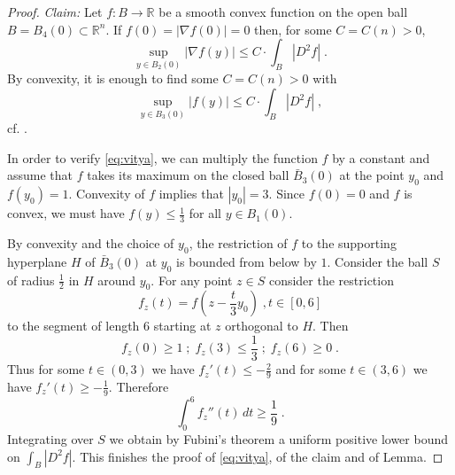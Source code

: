 \documentclass[12pt,leqno]{amsart}
\numberwithin{equation}{section}
\theoremstyle{definition}
\theoremstyle{remark}
\newcommand{\R}{\mathbb{R}}
\begin{document}
\begin{proof}
\emph{Claim:} Let $f:B \to \R$ be a smooth convex function on the open ball $B=B_4 (0)\subset \R^n$.
If $f(0)=|\nabla f(0)| =0$ then, for some $C=C(n)>0$,
$$\sup_{y\in B_2 (0)} |\nabla f (y)| \leq C\cdot \int _{B} |D^2f| \;.$$
By convexity, it is enough to find some $C=C(n)>0$ with
\begin{equation}  \label{eq:vitya}
\sup _{y\in B_3 (0) }| f(y)| \leq C \cdot \int _{B} |D^2f|\; ,
 \end{equation}
 cf. \cite[Theorem 6.7]{Evans}.

In order to verify \eqref{eq:vitya}, we can multiply the function $f$ by a constant and assume that
 $f$ takes its maximum on the closed ball $\bar B_3 (0)$ at the point $y_0$ and $f(y_0)=1$.  Convexity of $f$ implies that $|y_0|=3$.
 Since $f(0)=0$ and  $f$ is convex, we must have $f(y)\leq \frac 1 3$ for all $y\in B_1(0)$.

 By convexity and the choice of $y_0$, the restriction of $f$ to the supporting  hyperplane $H$ of $\bar B_3(0)$ at $y_0$ is bounded from below by $1$. Consider the ball  $S$ of radius $\frac 1 2$ in $H$ around $y_0$. For any point $z\in S$ consider the restriction
 $$f_z  (t)= f(z- \frac t 3 y_0 ) \;, t\in [0,6]$$  to the segment of length $6$   starting at $z$ orthogonal to $H$.
 Then $$f_z(0)\geq 1 \; ; \; f_z (3)\leq \frac 1 3 \; ; \; f_z (6) \geq 0 \;.$$
 Thus for some $t\in (0,3)$ we have $f_z'(t) \leq  -\frac  2 9$ and for some $t\in (3,6)$ we have $f_z'(t) \geq  - \frac  1 9$.
 Therefore
 $$\int _0 ^6 f_z'' (t)\, dt  \geq \frac 1 9 \; .$$
 Integrating over $S$ we obtain by Fubini's  theorem a uniform positive lower bound on $\int _{B} |D^2f|$.
 This finishes the proof of \eqref{eq:vitya}, of the claim and of Lemma.
\end{proof}
\end{document}
